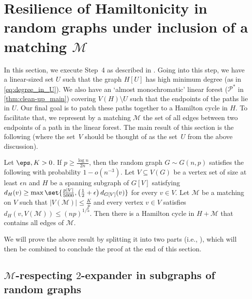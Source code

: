 \documentclass[10pt,a4paper,reqno]{amsart}
\begin{document}
\bigskip \section{Resilience of Hamiltonicity in random graphs under inclusion of a matching \texorpdfstring{$\mathcal{M}$}{M}}\label{sec:resilience of Hamiltonicity}

In this section, we execute Step~4 as described in . Going into this step, we have a linear-sized set $U$ such that the graph $H[U]$ has high minimum degree (as in \ref{eq:degree_in_U}). We also have an `almost monochromatic' linear forest ($\mathcal{P}^*$ in \cref{thm:clean-up_main}) covering $V(H)\setminus U$ such that the endpoints of the paths lie in $U$. Our final goal is to patch these paths together to a Hamilton cycle in $H$. To facilitate that, we represent by a matching $\mathcal{M}$ the set of all edges between two endpoints of a path in the linear forest. The main result of this section is the following (where the set~$V$ should be thought of as the set~$U$ from the above discussion).
\begin{theorem}
  \label{thm:main result of 7th section}
  Let $\eps, K >0$. If $p \ge \frac{\log n}{2n}$, then the random graph $G \sim G(n,p)$ satisfies the following with probability $1-o(n^{-3})$. Let $V \subseteq V(G)$ be a vertex set of size at least $\epsilon n$ and $H$ be a spanning subgraph of $G[V]$ satisfying $d_H(v)\ge \max\set{\frac{p|V|}{5000}, \left(\frac{1}{2} + \epsilon\right)d_{G[V]}(v)}$ for every $v\in V$. Let $\mathcal{M}$ be a matching on $V$ such that $|V(\mathcal{M})|\le \frac{K}{p}$ and every vertex $v\in V$ satisfies $d_H(v,V(\mathcal{M}))\le (np)^{1/5}$. Then there is a Hamilton cycle in $H + \mathcal{M}$ that contains all edges of $\mathcal{M}$.
\end{theorem}
We will prove the above result by splitting it into two parts (i.e., ), which will then be combined to conclude the proof at the end of this section.

\subsection{\texorpdfstring{$\mathcal{M}$-respecting $2$-expander in subgraphs of random graphs}{M-respecting 2-expander in subgraphs of random graphs}}
\label{sec:expander}
\end{document}
